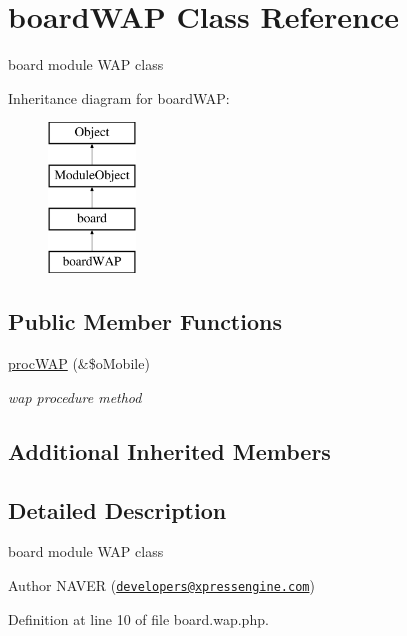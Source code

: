 \hypertarget{classboardWAP}{}\section{board\+W\+AP Class Reference}
\label{classboardWAP}


board module W\+AP class  


Inheritance diagram for board\+W\+AP\+:\begin{figure}[H]
\begin{center}
\leavevmode
\includegraphics[height=4.000000cm]{classboardWAP}
\end{center}
\end{figure}
\subsection*{Public Member Functions}
\begin{DoxyCompactItemize}
\item 
\hyperlink{classboardWAP_a64fd2fe05d7bb01d701f07e763f54a4b}{proc\+W\+AP} (\&\$o\+Mobile)
\begin{DoxyCompactList}\small\item\em wap procedure method \end{DoxyCompactList}\end{DoxyCompactItemize}
\subsection*{Additional Inherited Members}


\subsection{Detailed Description}
board module W\+AP class 

\begin{DoxyAuthor}{Author}
N\+A\+V\+ER (\href{mailto:developers@xpressengine.com}{\tt developers@xpressengine.\+com}) 
\end{DoxyAuthor}


Definition at line 10 of file board.\+wap.\+php.



